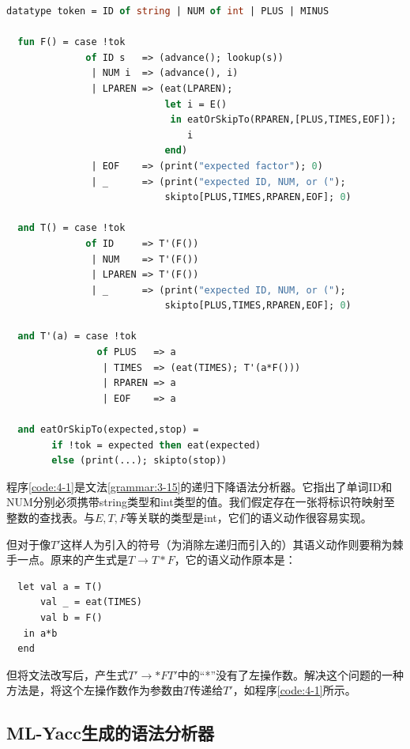 \documentclass[cn,11pt,chinese]{elegantbook}
\begin{document}
\begin{lstlisting}[language=ml,caption={文法\ref{grammar:3-15}的递归下降解释器},label={code:4-1}]
  datatype token = ID of string | NUM of int | PLUS | MINUS

  fun F() = case !tok
              of ID s   => (advance(); lookup(s))
               | NUM i  => (advance(), i)
               | LPAREN => (eat(LPAREN);
                            let i = E()
                             in eatOrSkipTo(RPAREN,[PLUS,TIMES,EOF]);
                                i
                            end)
               | EOF    => (print("expected factor"); 0)
               | _      => (print("expected ID, NUM, or (");
                            skipto[PLUS,TIMES,RPAREN,EOF]; 0)

  and T() = case !tok
              of ID     => T'(F())
               | NUM    => T'(F())
               | LPAREN => T'(F())
               | _      => (print("expected ID, NUM, or (");
                            skipto[PLUS,TIMES,RPAREN,EOF]; 0)

  and T'(a) = case !tok
                of PLUS   => a
                 | TIMES  => (eat(TIMES); T'(a*F()))
                 | RPAREN => a
                 | EOF    => a

  and eatOrSkipTo(expected,stop) =
        if !tok = expected then eat(expected)
        else (print(...); skipto(stop))
\end{lstlisting}

程序\ref{code:4-1}是文法\ref{grammar:3-15}的递归下降语法分析器。它指出了单词ID和NUM分别必须携带string类型和int类型的值。我们假定存在一张将标识符映射至整数的查找表。与$E,T,F$等关联的类型是int，它们的语义动作很容易实现。

但对于像$T'$这样人为引入的符号（为消除左递归而引入的）其语义动作则要稍为棘手一点。原来的产生式是$T\rightarrow T*F$，它的语义动作原本是：

\begin{lstlisting}
  let val a = T()
      val _ = eat(TIMES)
      val b = F()
   in a*b
  end
\end{lstlisting}

但将文法改写后，产生式$T'\rightarrow *FT'$中的“*”没有了左操作数。解决这个问题的一种方法是，将这个左操作数作为参数由$T$传递给$T'$，如程序\ref{code:4-1}所示。

\subsection{ML-Yacc生成的语法分析器}
\end{document}
